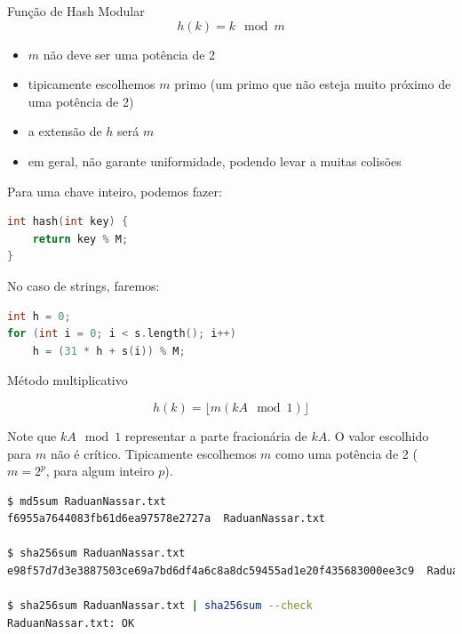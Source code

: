 \begin{frame}
\framebreak

Função de Hash Modular
 $$h(k) = k \mod m$$

\begin{itemize}
\item $m$ não deve ser uma potência de 2
\item tipicamente escolhemos $m$ primo
  (um primo que não esteja muito próximo de uma potência de 2)
\item a extensão de $h$ será $m$
\item em geral, não garante uniformidade, podendo levar a muitas colisões
\end{itemize}


\framebreak

Para uma chave inteiro, podemos fazer:
\begin{lstlisting}[language=C, label=lst-hash-mod, caption={Função de Hash Modular.}, postbreak=\mbox{$\hookrightarrow$\space}, basicstyle=\fontsize{8}{10}\selectfont\ttfamily]
int hash(int key) {
    return key % M;
}
\end{lstlisting}


No caso de strings, faremos:
\begin{lstlisting}[language=C, label=lst-hash-mod, caption={Função de Hash Modular.}, postbreak=\mbox{$\hookrightarrow$\space}, basicstyle=\fontsize{8}{10}\selectfont\ttfamily]
int h = 0;
for (int i = 0; i < s.length(); i++)
    h = (31 * h + s(i)) % M;
\end{lstlisting}

\framebreak

Método multiplicativo

  $$h(k) = \lfloor m (kA \mod 1) \rfloor $$

Note que $kA \mod 1$ representar a parte fracionária de $kA$.
O valor escolhido para $m$ não é crítico.
Tipicamente escolhemos $m$ como uma potência de 2 ($m=2^p$, para algum inteiro $p$).


\framebreak

\begin{lstlisting}[language=bash, label=lst-hash-ex01, caption={Hash de arquivo.}, postbreak=\mbox{$\hookrightarrow$\space}, basicstyle=\fontsize{8}{10}\selectfont\ttfamily]
$ md5sum RaduanNassar.txt
f6955a7644083fb61d6ea97578e2727a  RaduanNassar.txt

$ sha256sum RaduanNassar.txt
e98f57d7d3e3887503ce69a7bd6df4a6c8a8dc59455ad1e20f435683000ee3c9  RaduanNassar.txt

$ sha256sum RaduanNassar.txt | sha256sum --check
RaduanNassar.txt: OK
\end{lstlisting}


\end{frame}
